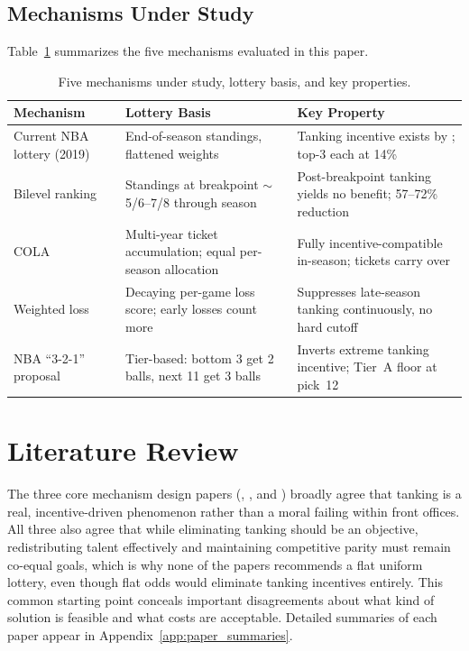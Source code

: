 \documentclass{article}
\begin{document}
\subsection{Mechanisms Under Study}

Table~\ref{tab:mechanisms} summarizes the five mechanisms evaluated in this
paper.

\begin{table}[h]
\centering
\renewcommand{\arraystretch}{1.4}
\begin{tabular}{p{3.8cm} p{3.8cm} p{5.4cm}}
\toprule
\textbf{Mechanism} & \textbf{Lottery Basis} & \textbf{Key Property} \\
\midrule
Current NBA lottery (2019) &
End-of-season standings, flattened weights &
Tanking incentive exists by \citet{banchio2020}; top-3 each at 14\% \\
Bilevel ranking \citep{kazachkov2020} &
Standings at breakpoint $\sim$5/6--7/8 through season &
Post-breakpoint tanking yields no benefit; 57--72\% reduction \\
COLA \citep{highley2026} &
Multi-year ticket accumulation; equal per-season allocation &
Fully incentive-compatible in-season; tickets carry over \\
Weighted loss &
Decaying per-game loss score; early losses count more &
Suppresses late-season tanking continuously, no hard cutoff \\
NBA ``3-2-1'' proposal &
Tier-based: bottom 3 get 2 balls, next 11 get 3 balls &
Inverts extreme tanking incentive; Tier~A floor at pick~12 \\
\bottomrule
\end{tabular}
\caption{Five mechanisms under study, lottery basis, and key properties.}
\label{tab:mechanisms}
\end{table}


\section{Literature Review}

The three core mechanism design papers (\citet{banchio2020},
\citet{kazachkov2020}, and \citet{highley2026}) broadly agree that tanking
is a real, incentive-driven phenomenon rather than a moral failing within
front offices.
All three also agree that while eliminating tanking should be an objective,
redistributing talent effectively and maintaining competitive parity must
remain co-equal goals, which is why none of the papers recommends a flat
uniform lottery, even though flat odds would eliminate tanking incentives
entirely.
This common starting point conceals important disagreements about what kind
of solution is feasible and what costs are acceptable.
Detailed summaries of each paper appear in Appendix~\ref{app:paper_summaries}.
\end{document}
